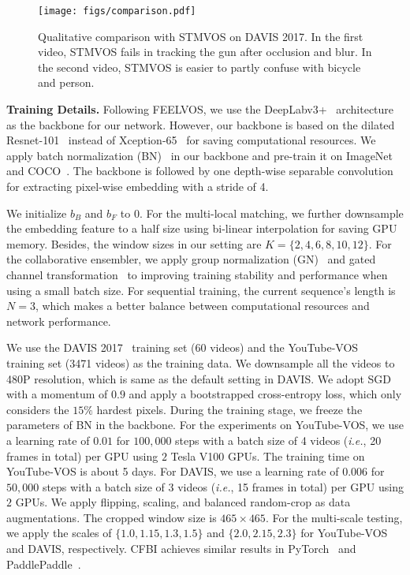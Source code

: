 \documentclass[runningheads]{llncs}
\def\ie{\emph{i.e.}}
\newcommand{\zongxin}[1]{#1}
\begin{document}
\begin{figure}[t!]
    \centering
    \texttt{[image: figs/comparison.pdf]}

    \caption{Qualitative comparison with STMVOS on DAVIS 2017. In the first video, STMVOS fails in tracking the gun after occlusion and blur. In the second video, STMVOS is easier to partly confuse with bicycle and person.}
    \label{fig:comparison}

\end{figure}

\noindent\textbf{Training Details.}
Following FEELVOS, we use the DeepLabv3+~\cite{deeplabv3p} architecture as the backbone for our network. However, our backbone is based on the dilated Resnet-101~\cite{deeplabv3p} instead of Xception-65~\cite{xception} for saving computational resources. We apply batch normalization (BN)~\cite{bn} in our backbone and pre-train it on ImageNet~\cite{deng2009imagenet} and COCO~\cite{coco}. The backbone is followed by one depth-wise separable convolution for extracting pixel-wise embedding with a stride of 4.

We initialize $b_B$ and $b_F$ to $0$. For the multi-local matching, we further downsample the embedding feature to a half size using bi-linear interpolation for saving GPU memory. Besides, the window sizes in our setting are $K=\{2, 4, 6, 8, 10, 12\}$. For the collaborative ensembler, we apply group normalization (GN)~\cite{gn} and gated channel transformation~\cite{gct} to improving training stability and performance when using a small batch size. For sequential training, the current sequence's length is $N=3$, which makes a better balance between computational resources and network performance.



We use the DAVIS 2017~\cite{davis2017} training set (60 videos) and the YouTube-VOS~\cite{youtubevos} training set (3471 videos) as the training data. \zongxin{We downsample all the videos to 480P resolution, which is same as the default setting in DAVIS.} We adopt SGD with a momentum of $0.9$ and apply a bootstrapped cross-entropy loss, which only considers the $15\%$ hardest pixels. During the training stage, we freeze the parameters of BN in the backbone. For the experiments on YouTube-VOS, we use a learning rate of $0.01$ for $100,000$ steps with a batch size of 4 videos (\ie, 20 frames in total) per GPU using $2$ Tesla V100 GPUs. The training time on YouTube-VOS is about 5 days. For DAVIS, we use a learning rate of $0.006$ for $50,000$ steps with a batch size of 3 videos (\ie, 15 frames in total) per GPU using $2$ GPUs.
We apply flipping, scaling, and balanced random-crop as data augmentations. The cropped window size is $465\times 465$. For the multi-scale testing, we apply the scales of $\{1.0, 1.15, 1.3, 1.5\}$ and $\{2.0, 2.15, 2.3\}$ for YouTube-VOS and DAVIS, respectively. CFBI achieves similar results in PyTorch~\cite{pytorch} and PaddlePaddle~\cite{paddlepaddle}.
\end{document}
